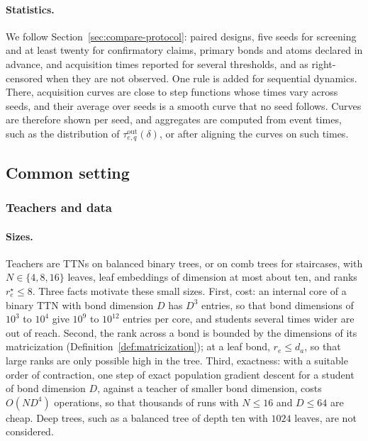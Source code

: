 \documentclass[11pt]{article}
\theoremstyle{definition}
\numberwithin{equation}{section}
\begin{document}
\paragraph{Statistics.}
We follow Section~\ref{sec:compare-protocol}: paired designs, five seeds for screening and at least twenty for confirmatory claims, primary bonds and atoms declared in advance, and acquisition times reported for several thresholds, and as right-censored when they are not observed. One rule is added for sequential dynamics. There, acquisition curves are close to step functions whose times vary across seeds, and their average over seeds is a smooth curve that no seed follows. Curves are therefore shown per seed, and aggregates are computed from event times, such as the distribution of $\tau^{\mathrm{out}}_{e,q}(\delta)$, or after aligning the curves on such times.

\subsection{Common setting}\label{sec:exp-setting}

\subsubsection{Teachers and data}\label{sec:exp-teachers}

\paragraph{Sizes.}
Teachers are TTNs on balanced binary trees, or on comb trees for staircases, with $N\in\{4,8,16\}$ leaves, leaf embeddings of dimension at most about ten, and ranks $r^\star_e\le8$. Three facts motivate these small sizes. First, cost: an internal core of a binary TTN with bond dimension $D$ has $D^3$ entries, so that bond dimensions of $10^3$ to $10^4$ give $10^9$ to $10^{12}$ entries per core, and students several times wider are out of reach. Second, the rank across a bond is bounded by the dimensions of its matricization (Definition~\ref{def:matricization}); at a leaf bond, $r_e\le d_a$, so that large ranks are only possible high in the tree. Third, exactness: with a suitable order of contraction, one step of exact population gradient descent for a student of bond dimension $D$, against a teacher of smaller bond dimension, costs $O(ND^4)$ operations, so that thousands of runs with $N\le16$ and $D\le64$ are cheap. Deep trees, such as a balanced tree of depth ten with $1024$ leaves, are not considered.
\end{document}
